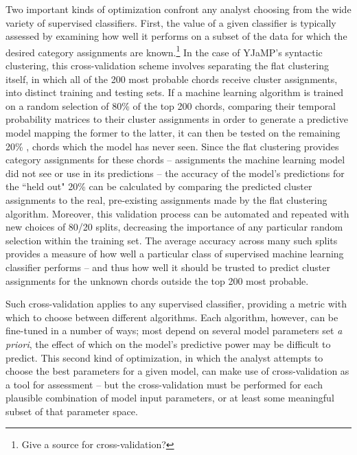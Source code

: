 Two important kinds of optimization confront any analyst choosing from the wide variety of supervised classifiers.  First, the value of a given classifier is typically assessed by examining how well it performs on a subset of the data for which the desired category assignments are known.\footnote{Give a source for cross-validation?}  In the case of YJaMP's syntactic clustering, this cross-validation scheme involves separating the flat clustering itself, in which all of the 200 most probable chords receive cluster assignments, into distinct training and testing sets.  If a machine learning algorithm is trained on a random selection of 80\% of the top 200 chords, comparing their temporal probability matrices to their cluster assignments in order to generate a predictive model mapping the former to the latter, it can then be tested on the remaining 20\% , chords which the model has never seen.  Since the flat clustering provides category assignments for these chords -- assignments the machine learning model did not see or use in its predictions -- the accuracy of the model's predictions for the ``held out" 20\% can be calculated by comparing the predicted cluster assignments to the real, pre-existing assignments made by the flat clustering algorithm.  Moreover, this validation process can be automated and repeated with new choices of 80/20 splits, decreasing the importance of any particular random selection within the training set.  The average accuracy across many such splits provides a measure of how well a particular class of supervised machine learning classifier performs -- and thus how well it should be trusted to predict cluster assignments for the unknown chords outside the top 200 most probable.


Such cross-validation applies to any supervised classifier, providing a metric with which to choose between different algorithms.  Each algorithm, however, can be fine-tuned in a number of ways; most depend on several model parameters set \emph{a priori}, the effect of which on the model's predictive power may be difficult to predict.  This second kind of optimization, in which the analyst attempts to choose the best parameters for a given model, can make use of cross-validation as a tool for assessment -- but the cross-validation must be performed for each plausible combination of model input parameters, or at least some meaningful subset of that parameter space.

